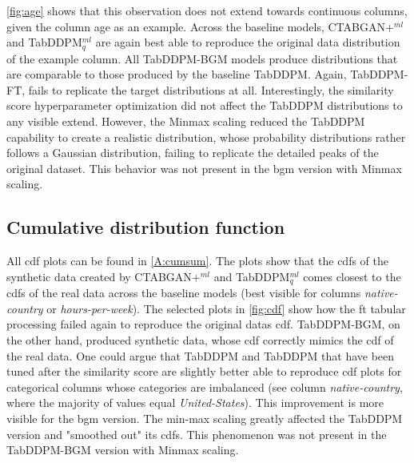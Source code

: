 \autoref{fig:age} shows that this observation does not extend towards continuous columns, given the column age as an example.
Across the baseline models, CTABGAN+$^{ml}$ and TabDDPM$^{ml}_q$ are again best able to reproduce the original data distribution of the example column.
All TabDDPM-BGM models produce distributions that are comparable to those produced by the baseline TabDDPM.
Again, TabDDPM-FT, fails to replicate the target distributions at all.
Interestingly, the similarity score hyperparameter optimization did not affect the TabDDPM distributions to any visible extend.
However, the Minmax scaling reduced the TabDDPM capability to create a realistic distribution, whose probability distributions rather follows a Gaussian distribution, failing to replicate the detailed peaks of the original dataset.
This behavior was not present in the \gls{bgm} version with Minmax scaling.


\subsection{Cumulative distribution function}

All \gls{cdf} plots can be found in \autoref{A:cumsum}.
The plots show that the \glspl{cdf} of the synthetic data created by CTABGAN+$^{ml}$ and TabDDPM$^{ml}_q$ comes closest to
the \glspl{cdf} of the real data across the baseline models (best visible for columns \textit{native-country} or \textit{hours-per-week}).
The selected plots in \autoref{fig:cdf} show how the \gls{ft} tabular processing failed again to reproduce the original datas \gls{cdf}.
TabDDPM-BGM, on the other hand, produced synthetic data, whose \gls{cdf} correctly mimics the \gls{cdf} of the real data.
One could argue that TabDDPM and TabDDPM that have been tuned after the similarity score are slightly better able to
reproduce \gls{cdf} plots for categorical columns whose categories are imbalanced (\eg see column \textit{native-country}, where the majority of values equal \textit{United-States}).
This improvement is more visible for the \gls{bgm} version.
The min-max scaling greatly affected the TabDDPM version and "smoothed out" its \glspl{cdf}.
This phenomenon was not present in the TabDDPM-BGM version with Minmax scaling.

